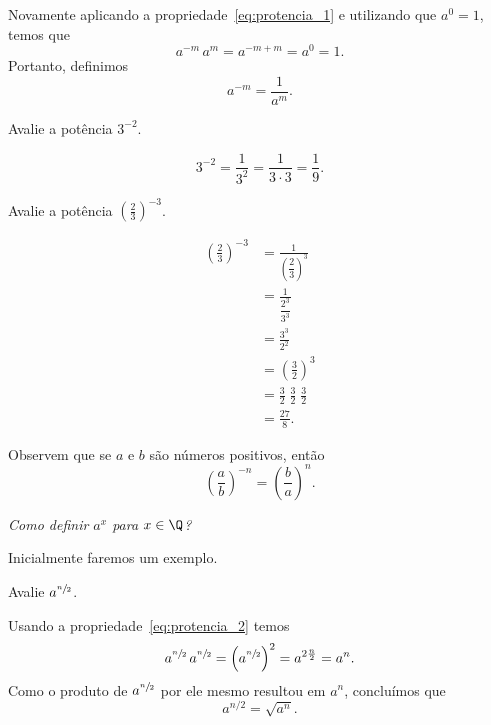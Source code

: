 Novamente aplicando a propriedade~\eqref{eq:protencia_1} e utilizando
que $a^0=1$, temos que
\[
  a^{-m}\, a^{m}
  = a^{-m+m}
  =a^0
  =1.
\]
Portanto, definimos
\begin{equation}
  \label{eq:potencia_negativa}
  a^{-m} = \frac{1}{a^m}.
\end{equation}

\begin{example}
  Avalie a potência \(3^{-2}\).

  \solution
  \[
    3^{-2}
    = \frac{1}{3^2}
    = \frac{1}{3\cdot 3}
    = \frac{1}{9}.
  \]
\end{example}

\begin{example}
  Avalie a potência \(\left(\frac{2}{3}\right)^{-3}\).

  \solution
  \begin{align*}
    \left(\frac{2}{3}\right)^{-3}
    & = \frac{1}{\left(\dfrac{2}{3}\right)^3}  \\[2mm]
    & = \frac{1}{\dfrac{2^3}{3^3}}             \\[2mm]
    & = \frac{3^3}{2^2}                        \\[2mm]
    & = \left(\frac{3}{2}\right)^{3}           \\[2mm]
    & = \frac{3}{2}\;\frac{3}{2}\;\frac{3}{2}  \\[2mm]
    & = \frac{27}{8}.
  \end{align*}
\end{example}

Observem que se $a$ e $b$ são números positivos, então
\begin{equation}
  \left(\frac{a}{b}\right)^{-n}=\left(\frac{b}{a}\right)^{n}.
\end{equation}

\emph{Como definir $a^x$ para $x\in\Q$?}

Inicialmente faremos um exemplo.

\begin{example}
  Avalie \(a^{\sfrac{n}{2}}\).

  \solution
  Usando a propriedade~\eqref{eq:protencia_2} temos
  \[
    a^{\sfrac{n}{2}}\, a^{\sfrac{n}{2}}
    = \left(a^{\sfrac{n}{2}}\right)^2
    = a^{2\frac{n}{2}}
    = a^n.
  \]
  Como o produto de \(a^{\sfrac{n}{2}}\) por ele mesmo resultou em $a^n$,
  concluímos que
  \[
    a^{n/2} = \sqrt{a^n}.
  \]
\end{example}

